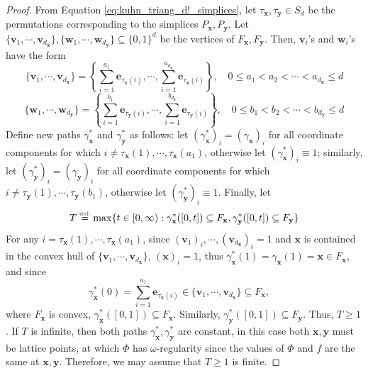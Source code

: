 \documentclass{article}
\numberwithin{equation}{section}
\theoremstyle{definition}
\newcommand{\eqdef}{\ensuremath{\stackrel{\mbox{\upshape\tiny def.}}{=}}}
\begin{document}
\begin{proof}
From Equation \ref{eq:kuhn_triang_d!_simplices}, let $\tau_{\mathbf{x}},\tau_{\mathbf{y}}\in S_d$ be the permutations corresponding to the simplices $P_{\mathbf{x}},P_{\mathbf{y}}$. 
Let
$\{ \mathbf{v}_1,\cdots,\mathbf{v}_{d_{\mathbf{x}}} \},
\{ \mathbf{w}_1,\cdots,\mathbf{w}_{d_{\mathbf{y}}} \}
\subseteq \{0,1\}^d$
be the vertices of $F_{\mathbf{x}},F_{\mathbf{y}}$. 
Then, $\mathbf{v}_i$'s and $\mathbf{w}_i$'s have the form
$$\{ \mathbf{v}_1,\cdots,\mathbf{v}_{d_{\mathbf{x}}} \} = 
\left\{ 
    \sum_{i=1}^{a_1} \mathbf{e}_{\tau_{\mathbf{x}}(i)},
    \cdots,
    \sum_{i=1}^{a_{d_{\mathbf{x}}}} \mathbf{e}_{\tau_{\mathbf{x}}(i)}
\right\},\quad
0\le a_1 < a_2 < \cdots < a_{d_{\mathbf{x}}} \le d$$
$$\{ \mathbf{w}_1,\cdots,\mathbf{w}_{d_{\mathbf{y}}} \} = 
\left\{ 
    \sum_{i=1}^{b_1} \mathbf{e}_{\tau_{\mathbf{y}}(i)},
    \cdots,
    \sum_{i=1}^{b_{d_{\mathbf{y}}}} \mathbf{e}_{\tau_{\mathbf{y}}(i)}
\right\},\quad
0\le b_1 < b_2 < \cdots < b_{d_{\mathbf{y}}} \le d$$
Define new paths $\gamma_{\mathbf{x}}^{\ast}$ and $\gamma_{\mathbf{y}}^{\ast}$ as follows: let $(\gamma_{\mathbf{x}}^{\ast})_i=(\gamma_{\mathbf{x}})_i$ for all coordinate components for which $i\ne\tau_{\mathbf{x}}(1),\cdots,\tau_{\mathbf{x}}(a_1)$, otherwise let $(\gamma_{\mathbf{x}}^{\ast})_i \equiv 1$; similarly, let $(\gamma_{\mathbf{y}}^{\ast})_i=(\gamma_{\mathbf{y}})_i$ for all coordinate components for which $i\ne\tau_{\mathbf{y}}(1),\cdots,\tau_{\mathbf{y}}(b_1)$, otherwise let $(\gamma_{\mathbf{y}}^{\ast})_i \equiv 1$. Finally, let
$$T  \eqdef  \max \{ t\in[0,\infty): 
               \gamma_{\mathbf{x}}^{\ast}([0,t])\subseteq F_{\mathbf{x}}, 
               \gamma_{\mathbf{y}}^{\ast}([0,t])\subseteq F_{\mathbf{y}} \}$$
For any $i=\tau_{\mathbf{x}}(1),\cdots,\tau_{\mathbf{x}}(a_1)$, since $(\mathbf{v}_1)_i,\cdots,(\mathbf{v}_{d_{\mathbf{x}}})_i = 1$ and $\mathbf{x}$ is contained in the convex hull of $\{ \mathbf{v}_1,\cdots,\mathbf{v}_{d_{\mathbf{x}}} \}$, $(\mathbf{x})_i = 1$, thus $\gamma_{\mathbf{x}}^{\ast}(1) = \gamma_{\mathbf{x}}(1) = \mathbf{x} \in F_{\mathbf{x}}$, and since
$$\gamma_{\mathbf{x}}^{\ast}(0) 
= \sum_{i=1}^{a_1} \mathbf{e}_{\tau_{\mathbf{x}}(i)} 
\in \{ \mathbf{v}_1,\cdots,\mathbf{v}_{d_{\mathbf{x}}} \}
\subseteq F_{\mathbf{x}}, \quad
$$
where $F_{\mathbf{x}}$ is convex, $\gamma_{\mathbf{x}}^{\ast}([0,1]) \subseteq F_{\mathbf{x}}$. Similarly, $\gamma_{\mathbf{y}}^{\ast}([0,1]) \subseteq F_{\mathbf{y}}$. Thus, $T\ge 1$. 
If $T$ is infinite, then both paths $\gamma_{\mathbf{x}}^{\ast},\gamma_{\mathbf{y}}^{\ast}$ are constant, in this case both $\mathbf{x},\mathbf{y}$ must be lattice points, at which $\Phi$ has $\omega$-regularity since the values of $\Phi$ and $f$ are the same at $\mathbf{x},\mathbf{y}$. Therefore, we may assume that $T\ge 1$ is finite. 



\end{proof}
\end{document}

